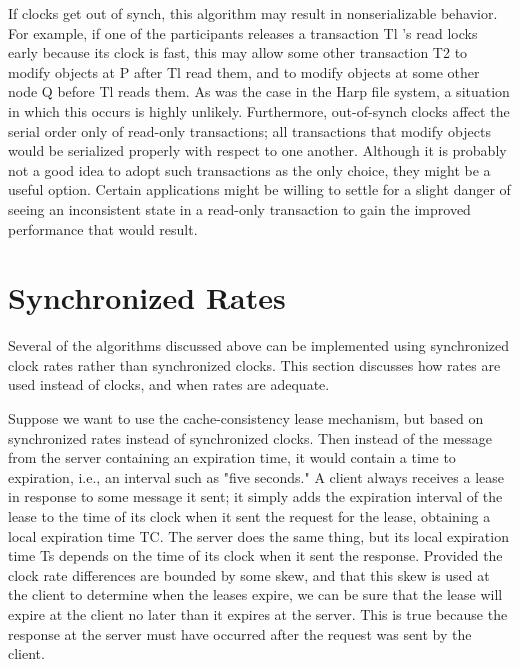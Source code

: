 \documentclass[a4paper,11pt,notitlepage,twoside,openright]{article}
\begin{document}
If clocks get out of synch, this algorithm may result in nonserializable
behavior. For example, if one of the participants releases a transaction
Tl 's read locks early because its clock is fast, this may allow some
other transaction T2 to modify objects at P after Tl read them, and to
modify objects at some other node Q before Tl reads them. As was the
case in the Harp file system, a situation in which this occurs is highly
unlikely. Furthermore, out-of-synch clocks affect the serial order only
of read-only transactions; all transactions that modify objects would be
serialized properly with respect to one another. Although it is probably
not a good idea to adopt such transactions as the only choice, they
might be a useful option. Certain applications might be willing to
settle for a slight danger of seeing an inconsistent state in a
read-only transaction to gain the improved performance that would
result.


\hypertarget{synchronized-rates}{%
\section{Synchronized Rates}\label{synchronized-rates}}


Several of the algorithms discussed above can be implemented using
synchronized clock rates rather than synchronized clocks. This section
discusses how rates are used instead of clocks, and when rates are
adequate.

Suppose we want to use the cache-consistency lease mechanism, but based
on synchronized rates instead of synchronized clocks. Then instead of
the message from the server containing an expiration time, it would
contain a time to expiration, i.e., an interval such as "five seconds."
A client always receives a lease in response to some message it sent; it
simply adds the expiration interval of the lease to the time of its
clock when it sent the request for the lease, obtaining a local
expiration time TC. The server does the same thing, but its local
expiration time Ts depends on the time of its clock when it sent the
response. Provided the clock rate differences are bounded by some skew,
and that this skew is used at the client to determine when the leases
expire, we can be sure that the lease will expire at the client no later
than it expires at the server. This is true because the response at the
server must have occurred after the request was sent by the client.
\end{document}
